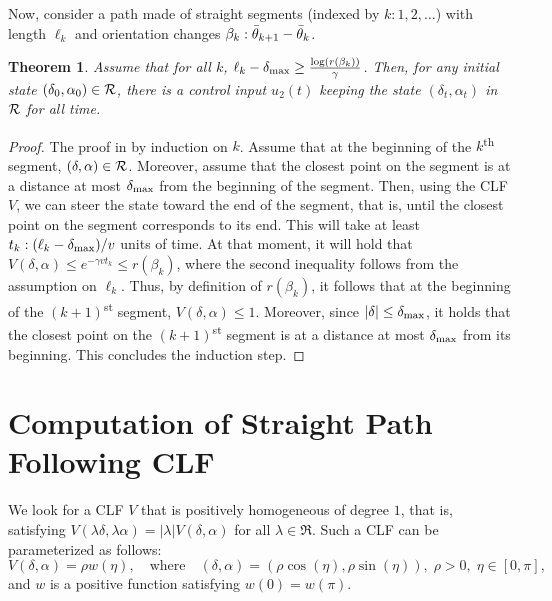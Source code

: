 \documentclass{article}
\theoremstyle{plain}
\newtheorem{theorem}{Theorem}
\theoremstyle{definition}
\theoremstyle{remark}
\newcommand{\deltamax}{\delta_\maxtxt}
\begin{document}
Now, consider a path made of straight segments (indexed by $k:1,2,\ldots$) with length $\ell_k$
and orientation changes $\beta_k:\bar{\theta}_{k+1}-\bar{\theta}_k$.

\begin{theorem}\label{thm-nonsmooth-safety}
Assume that for all $k$, $\ell_k-\deltamax\geq\frac{\log(r(\beta_k))}\gamma$.
Then, for any initial state $(\delta_0,\alpha_0)\in\mathcal{R}$,
there is a control input $u_2(t)$ keeping the state $(\delta_t,\alpha_t)$ in $\mathcal{R}$ for all time.
\end{theorem}

\begin{proof}
The proof in by induction on $k$.
Assume that at the beginning of the $k$\textsuperscript{th} segment,
$(\delta,\alpha)\in\mathcal{R}$.
Moreover, assume that the closest point on the segment is at a distance
at most $\deltamax$ from the beginning of the segment.
Then, using the CLF $V$, we can steer the state toward the end of the segment,
that is, until the closest point on the segment corresponds to its end.
This will take at least $t_k:(\ell_k-\deltamax)/v$ units of time.
At that moment, it will hold that $V(\delta,\alpha)\leq e^{-\gamma vt_k}\leq r(\beta_k)$,
where the second inequality follows from the assumption on $\ell_k$.
Thus, by definition of $r(\beta_k)$, it follows that at the beginning of
the $(k+1)$\textsuperscript{st} segment, $V(\delta,\alpha)\leq1$.
Moreover, since $\lvert\delta\rvert\leq\deltamax$, it holds that the closest point
on the $(k+1)$\textsuperscript{st} segment is at a distance at most $\deltamax$
from its beginning.
This concludes the induction step.
\end{proof}

\section{Computation of Straight Path Following CLF}\label{sec-computation}

We look for a CLF $V$ that is positively homogeneous of degree $1$,
that is, satisfying $V(\lambda\delta,\lambda\alpha)=\lvert\lambda\rvert V(\delta,\alpha)$
for all $\lambda\in\Re$.
Such a CLF can be parameterized as follows:
\begin{equation}\label{eq-clf-homogeneous}
V(\delta,\alpha) = \rho w(\eta), \quad\text{where}\quad (\delta,\alpha)=(\rho\cos(\eta),\rho\sin(\eta)), \; \rho>0, \; \eta\in[0,\pi],
\end{equation}
and $w$ is a positive function satisfying $w(0)=w(\pi)$.
\end{document}
